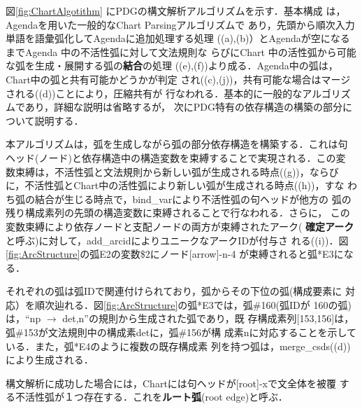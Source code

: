 \begin{figure*}[b]
 \begin{center}
 \end{center}
\myfiglabelskip
\caption{PDGボトムアップチャートパージングアルゴリズム}
\label{fig:ChartAlgotithm}
\end{figure*}

図\ref{fig:ChartAlgotithm} にPDGの構文解析アルゴリズムを示す．基本構成
は，Agendaを用いた一般的なChart Parsingアルゴリズム\cite{Winograd83}で
あり，先頭から順次入力単語を語彙弧化してAgendaに追加処理する処理
((a),(b)）とAgendaが空になるまでAgenda 中の不活性弧に対して文法規則な
らびにChart 中の活性弧から可能な弧を生成・展開する弧の{\bf 結合}の処理
((e),(f))より成る．Agenda中の弧は，Chart中の弧と共有可能かどうかが判定
され((c),(j))，共有可能な場合はマージされる((d))ことにより，圧縮共有が
行なわれる．基本的に一般的なアルゴリズムであり，詳細な説明は省略するが，
次にPDG特有の依存構造の構築の部分について説明する．

本アルゴリズムは，弧を生成しながら弧の部分依存構造を構築する．これは句
ヘッド(ノード)と依存構造中の構造変数を束縛することで実現される．この変
数束縛は，不活性弧と文法規則から新しい弧が生成される時点((g))，ならび
に，不活性弧とChart中の活性弧により新しい弧が生成される時点((h))，すな
わち弧の結合が生じる時点で，bind\_varにより不活性弧の句ヘッドが他方の
弧の残り構成素列の先頭の構造変数に束縛されることで行なわれる．さらに，
この変数束縛により依存ノードと支配ノードの両方が束縛されたアーク({\bf 
確定アーク}と呼ぶ)に対して，add\_arcidによりユニークなアークIDが付与さ
れる((i))．図\ref{fig:ArcStructure}の弧E2の変数\$2にノード[arrow]-n-4
が束縛されると弧*E3になる．


それぞれの弧は弧IDで関連付けられており，弧からその下位の弧(構成要素に
対応）を順次辿れる．図\ref{fig:ArcStructure}の弧*E3では，弧\#160(弧IDが
160の弧)は，``np $\rightarrow$ det,n''の規則から生成された弧であり，既
存構成素列[153,156]は，弧\#153が文法規則中の構成素detに，弧\#156が構
成素nに対応することを示している．また，弧*E4のように複数の既存構成素
列を持つ弧は，merge\_csds((d))により生成される．

構文解析に成功した場合には，Chartには句ヘッドが[root]-xで文全体を被覆
する不活性弧が１つ存在する．これを{\bf ルート弧}(root edge)と呼ぶ．


